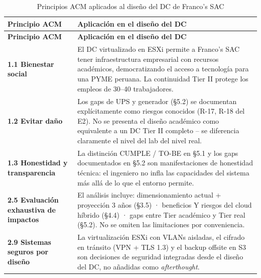 \documentclass[11pt, a4paper, oneside]{report}
\begin{document}
\begin{xltabular}{\textwidth}{@{}|L{3.2cm}|X|@{}}
\caption{Principios ACM aplicados al diseño del DC de Franco's SAC}
\label{tab:principios_acm} \\

\parbox[c][1.1cm][c]{\linewidth}{\centering\color{white}\bfseries\small Principio ACM} &
\parbox[c][1.1cm][c]{\linewidth}{\centering\color{white}\bfseries\small Aplicación en el diseño del DC} \\ \hline
\endfirsthead

\parbox[c][1.1cm][c]{\linewidth}{\centering\color{white}\bfseries\small Principio ACM} &
\parbox[c][1.1cm][c]{\linewidth}{\centering\color{white}\bfseries\small Aplicación en el diseño del DC} \\ \hline
\endhead

\hline
\endfoot

{\small \textbf{1.1 Bienestar social}} & {\small El DC virtualizado en ESXi permite a Franco's SAC tener infraestructura empresarial con recursos académicos, democratizando el acceso a tecnología para una PYME peruana. La continuidad Tier II protege los empleos de 30--40 trabajadores.} \\ \hline

{\small \textbf{1.2 Evitar daño}} & {\small Los gaps de UPS y generador (§5.2) se documentan explícitamente como riesgos conocidos (R-17, R-18 del E2). No se presenta el diseño académico como equivalente a un DC Tier II completo -- se diferencia claramente el nivel del lab del nivel real.} \\ \hline

{\small \textbf{1.3 Honestidad y transparencia}} & {\small La distinción CUMPLE / TO-BE en §5.1 y los gaps documentados en §5.2 son manifestaciones de honestidad técnica: el ingeniero no infla las capacidades del sistema más allá de lo que el entorno permite.} \\ \hline

{\small \textbf{2.5 Evaluación exhaustiva de impactos}} & {\small El análisis incluye: dimensionamiento actual + proyección 3 años (§3.5) · beneficios Y riesgos del cloud híbrido (§4.4) · gaps entre Tier académico y Tier real (§5.2). No se omiten las limitaciones por conveniencia.} \\ \hline

{\small \textbf{2.9 Sistemas seguros por diseño}} & {\small La virtualización ESXi con VLANs aisladas, el cifrado en tránsito (VPN + TLS 1.3) y el backup offsite en S3 son decisiones de seguridad integradas desde el diseño del DC, no añadidas como \textit{afterthought}.} \\ \hline

\end{xltabular}
\normalsize
\end{document}
